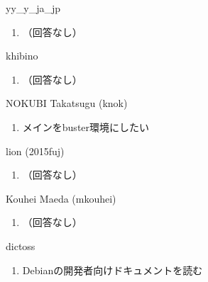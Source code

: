 \begin{prework}{ yy\_y\_ja\_jp }
  \begin{enumerate}
  \item （回答なし）
  \end{enumerate}
\end{prework}

\begin{prework}{ khibino }
  \begin{enumerate}
  \item （回答なし）
  \end{enumerate}
\end{prework}

\begin{prework}{ NOKUBI Takatsugu (knok) }
  \begin{enumerate}
  \item メインをbuster環境にしたい
  \end{enumerate}
\end{prework}

\begin{prework}{ lion (2015fuj) }
  \begin{enumerate}
  \item （回答なし）
  \end{enumerate}
\end{prework}

\begin{prework}{ Kouhei Maeda (mkouhei) }
  \begin{enumerate}
  \item （回答なし）
  \end{enumerate}
\end{prework}

\begin{prework}{ dictoss }
  \begin{enumerate}
  \item Debianの開発者向けドキュメントを読む
  \end{enumerate}
\end{prework}
